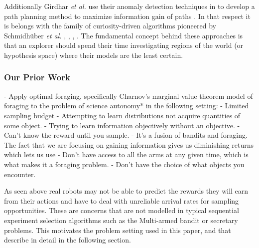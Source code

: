Additionally Girdhar \emph{et al.} use their anomaly detection techniques in
\cite{girdhar2013autonomous} to develop a path planning method to maximize
information gain of paths \cite{girdhar2014curiosity}.  In that respect it is
belongs with the family of curiosity-driven algorithms pioneered by
Schmidh{\"u}ber \emph{et al.} \cite{schmidhuber1997what},
\cite{schmidhuber2003exploring}, \cite{schmidhuber2009simple},
\cite{sun2011planning}.  The fundamental concept behind these approaches is
that an explorer should spend their time investigating regions of the world (or
hypothesis space) where their models are the least certain.

\subsubsection{Our Prior Work}
		- Apply optimal foraging, specifically Charnov's marginal value theorem
		model of foraging to the problem of science autonomy* in the following setting:	
			- Limited sampling budget
			- Attempting to learn distributions not acquire quantities of some object.
			- Trying to learn information objectively without an objective. 
			- Can't know the reward until you sample.
			- It's a fusion of bandits and foraging.  The fact that we are focusing on gaining information gives us diminishing returns which lets us use 
			- Don't have access to all the arms at any given time, which is what makes it a foraging problem.
			- Don't have the choice of what objects you encounter.

As seen above real robots may not be able to predict the rewards they will earn from their actions and have to deal with unreliable arrival rates for sampling opportunities.  These are concerns that are not modelled in typical sequential experiment selection algorithms such as the Multi-armed bandit or secretary problems.  This motivates the problem setting used in this paper, and that describe in detail in the following section.
